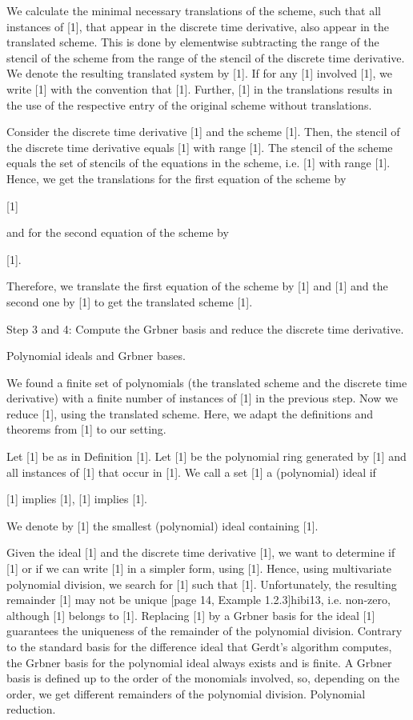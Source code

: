 \documentclass{article}
\begin{document}
We calculate the minimal necessary translations of the scheme, such that all instances of [1], that appear in the discrete time derivative, also appear in the translated scheme. This is done by elementwise subtracting the range of the stencil of the scheme from the range of the stencil of the discrete time derivative. We denote the resulting translated system by [1].
If for any [1] involved [1], we write [1] with the convention that [1].  Further, [1] in the translations results in the use of the respective entry of the original scheme without translations.
	
		Consider the discrete time derivative
		[1]
		and the scheme
		[1].
		Then, the stencil of the discrete time derivative equals 
		[1]
		with range
		[1].
		The stencil of the scheme equals the set of stencils of the equations in the scheme, i.e.
		[1]
		with range
		[1].
		Hence, we get the translations for the first equation of the scheme by
		
		[1]
		
		and for the second equation of the scheme by
		
		[1].
		
		Therefore, we translate the first equation of the scheme by [1] and [1] and the second one by [1] to get the translated scheme
		[1].
	
Step 3 and 4: Compute the Gr{}bner basis and reduce the discrete time derivative.


	Polynomial ideals and Gr{}bner bases.


	We found a finite set of polynomials (the translated scheme and the discrete time derivative) with a finite number of instances of [1] in the previous step. Now we reduce [1], using the translated scheme. Here, we adapt the definitions and theorems from [1] to our setting.
	
		Let [1] be as in Definition [1]. Let [1] be the polynomial ring generated by [1] and all instances of [1] that occur in [1].
		We call a set [1] a (polynomial) ideal if
		
			 [1] implies [1],
			 [1] implies [1].
		
	
	
		We denote by [1] the smallest (polynomial) ideal containing [1].
	
	Given the ideal [1] and the discrete time derivative [1], we want to determine if [1] or if we can write [1] in a simpler form, using [1].
	Hence, using multivariate polynomial division, we search for [1] such that
	[1].
	Unfortunately, the resulting remainder [1] may not be unique [page 14, Example 1.2.3]{hibi13}, i.e. non-zero, although [1] belongs to [1]. 
	Replacing [1] by a Gr{}bner basis for the ideal [1] guarantees the uniqueness of the remainder of the polynomial division. 
	Contrary to the standard basis for the difference ideal that Gerdt's algorithm computes, the Gr{}bner basis for the polynomial ideal always exists and is finite.
	A Gr{}bner basis is defined up to the order of the monomials involved, so, depending on the order, we get different remainders of the polynomial division.
	Polynomial reduction.
\end{document}
